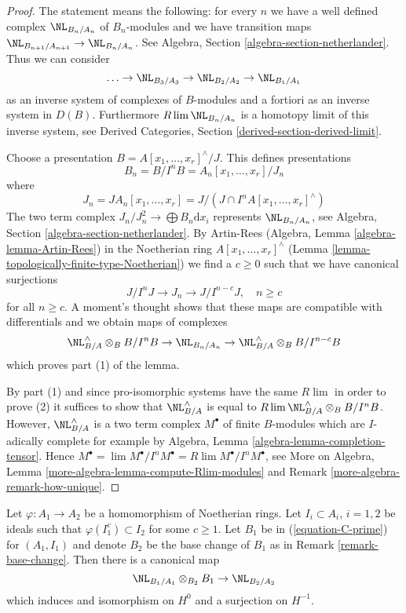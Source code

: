 \begin{proof}
The statement means the following: for every $n$ we have a well
defined complex $\NL_{B_n/A_n}$ of $B_n$-modules and we have
transition maps $\NL_{B_{n + 1}/A_{n + 1}} \to \NL_{B_n/A_n}$.
See Algebra, Section \ref{algebra-section-netherlander}.
Thus we can consider
$$
\ldots \to \NL_{B_3/A_3} \to \NL_{B_2/A_2} \to \NL_{B_1/A_1}
$$
as an inverse system of complexes of $B$-modules and a fortiori as
an inverse system in $D(B)$. Furthermore $R\lim \NL_{B_n/A_n}$
is a homotopy limit of this inverse system, see
Derived Categories, Section \ref{derived-section-derived-limit}.

\medskip\noindent
Choose a presentation $B = A[x_1, \ldots, x_r]^\wedge / J$. This
defines presentations
$$
B_n = B/I^nB = A_n[x_1, \ldots, x_r]/J_n
$$
where
$$
J_n = JA_n[x_1, \ldots, x_r] =
J/(J \cap I^nA[x_1, \ldots, x_r]^\wedge)
$$
The two term complex $J_n/J_n^2 \longrightarrow \bigoplus B_n \text{d}x_i$
represents $\NL_{B_n/A_n}$, see
Algebra, Section \ref{algebra-section-netherlander}.
By Artin-Rees (Algebra, Lemma \ref{algebra-lemma-Artin-Rees})
in the Noetherian ring $A[x_1, \ldots, x_r]^\wedge$
(Lemma \ref{lemma-topologically-finite-type-Noetherian})
we find a $c \geq 0$ such that we have canonical surjections
$$
J/I^nJ \to J_n \to J/I^{n - c}J,\quad n \geq c
$$
for all $n \geq c$. A moment's thought shows that these maps are
compatible with differentials and we obtain maps of complexes
$$
\NL_{B/A}^\wedge \otimes_B B/I^nB \to
\NL_{B_n/A_n} \to
\NL_{B/A}^\wedge \otimes_B B/I^{n - c}B
$$
which proves part (1) of the lemma.

\medskip\noindent
By part (1) and since pro-isomorphic
systems have the same $R\lim$ in order to prove (2)
it suffices to show that $\NL_{B/A}^\wedge$ is
equal to $R\lim \NL_{B/A}^\wedge \otimes_B B/I^nB$.
However, $\NL_{B/A}^\wedge$ is a two term complex $M^\bullet$
of finite $B$-modules which are $I$-adically complete for example by
Algebra, Lemma \ref{algebra-lemma-completion-tensor}. Hence
$M^\bullet = \lim M^\bullet/I^nM^\bullet = R\lim M^\bullet/I^n M^\bullet$, see
More on Algebra, Lemma \ref{more-algebra-lemma-compute-Rlim-modules} and
Remark \ref{more-algebra-remark-how-unique}.
\end{proof}

\begin{lemma}
\label{lemma-NL-base-change}
Let $\varphi : A_1 \to A_2$ be a homomorphism of Noetherian rings.
Let $I_i \subset A_i$, $i = 1, 2$ be ideals such that
$\varphi(I_1^c) \subset I_2$ for some $c \geq 1$.
Let $B_1$ be in (\ref{equation-C-prime}) for $(A_1, I_1)$
and denote $B_2$ be the base change of $B_1$ as in
Remark \ref{remark-base-change}. Then there is a canonical map
$$
\NL_{B_1/A_1} \otimes_{B_2} B_1 \to \NL_{B_2/A_2}
$$
which induces and isomorphism on $H^0$ and a surjection on $H^{-1}$.
\end{lemma}

